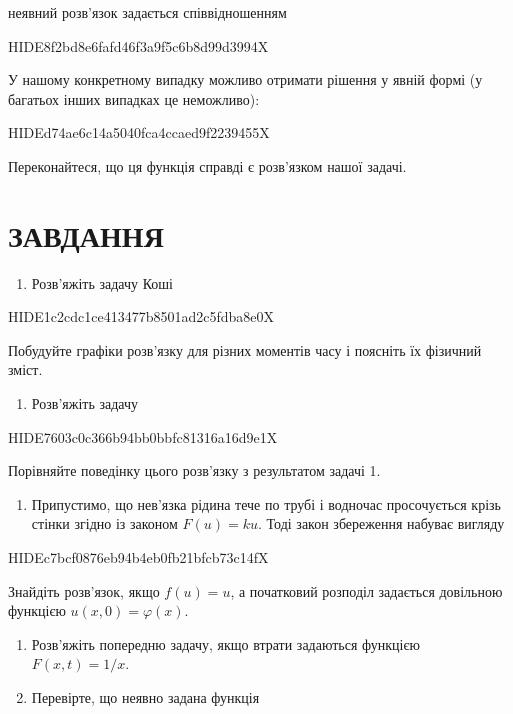 \documentclass[
  ukrainian,
]{article}
\providecommand{\tightlist}{%
  \setlength{\itemsep}{0pt}\setlength{\parskip}{0pt}}
\begin{document}
неявний розв'язок задається співвідношенням

HIDE8f2bd8e6fafd46f3a9f5c6b8d99d3994X

У нашому конкретному випадку можливо отримати рішення у явній формі (у
багатьох інших випадках це неможливо):

HIDEd74ae6c14a5040fca4ccaed9f2239455X

Переконайтеся, що ця функція справді є розв'язком нашої задачі.

\section{ЗАВДАННЯ}\label{ux437ux430ux432ux434ux430ux43dux43dux44f-12}

\begin{enumerate}
\def\labelenumi{\arabic{enumi}.}
\tightlist
\item
  Розв'яжіть задачу Коші
\end{enumerate}

HIDE1c2cdc1ce413477b8501ad2c5fdba8e0X

Побудуйте графіки розв'язку для різних моментів часу і поясніть їх
фізичний зміст.

\begin{enumerate}
\def\labelenumi{\arabic{enumi}.}
\setcounter{enumi}{1}
\tightlist
\item
  Розв'яжіть задачу
\end{enumerate}

HIDE7603c0c366b94bb0bbfc81316a16d9e1X

Порівняйте поведінку цього розв'язку з результатом задачі 1.

\begin{enumerate}
\def\labelenumi{\arabic{enumi}.}
\setcounter{enumi}{2}
\tightlist
\item
  Припустимо, що нев'язка рідина тече по трубі і водночас просочується
  крізь стінки згідно із законом \(F(u)=ku\). Тоді закон збереження
  набуває вигляду
\end{enumerate}

HIDEc7bcf0876eb94b4eb0fb21bfcb73c14fX

Знайдіть розв'язок, якщо \(f(u)=u\), а початковий розподіл задається
довільною функцією \(u(x,0)=\varphi(x)\).

\begin{enumerate}
\def\labelenumi{\arabic{enumi}.}
\setcounter{enumi}{3}
\item
  Розв'яжіть попередню задачу, якщо втрати задаються функцією
  \(F(x,t)=1/x\).
\item
  Перевірте, що неявно задана функція
\end{enumerate}
\end{document}
